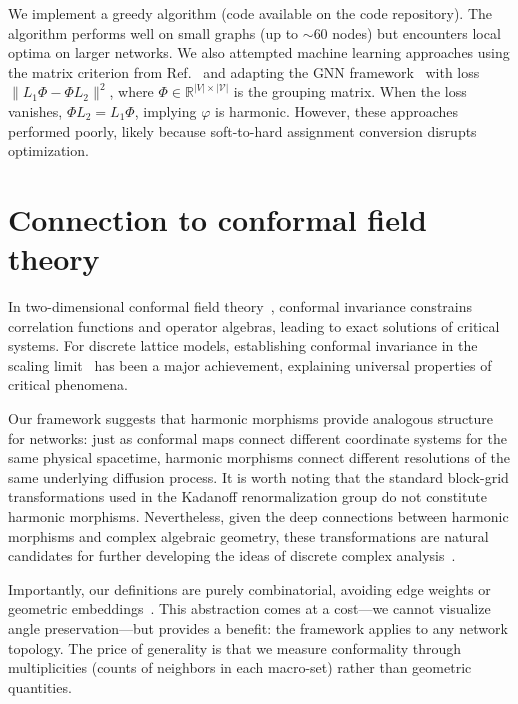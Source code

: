 \documentclass[twocolumn,superscriptaddress,tightenlines,aps,prx,floatfix]{revtex4-2}
\begin{document}
\begin{bibunit}
We implement a greedy algorithm (code available on the code repository). The algorithm performs well on small graphs (up to $\sim 60$ nodes) but encounters local optima on larger networks. We also attempted machine learning approaches using the matrix criterion from Ref.~\cite{Melles2024} and adapting the GNN framework~\cite{Coarse_graining_network_De_Domenico} with loss $\|L_1\Phi - \Phi L_2\|^2$, where $\Phi \in \mathbb{R}^{|V| \times |\mathcal{V}|}$ is the grouping matrix. When the loss vanishes, $\Phi L_2 = L_1 \Phi$, implying $\varphi$ is harmonic. However, these approaches performed poorly, likely because soft-to-hard assignment conversion disrupts optimization.


\section{Connection to conformal field theory}
\label{si:link-to-conformal-field-theory}

In two-dimensional conformal field theory~\cite{Introduction_to_Conformal_Field_Theory}, conformal invariance constrains correlation functions and operator algebras, leading to exact solutions of critical systems. For discrete lattice models, establishing conformal invariance in the scaling limit~\cite{Conformal_Invariance_Lattice_Models_Smirnov,Discrete_Complex_Analysis} has been a major achievement, explaining universal properties of critical phenomena. 

Our framework suggests that harmonic morphisms provide analogous structure for networks: just as conformal maps connect different coordinate systems for the same physical spacetime, harmonic morphisms connect different resolutions of the same underlying diffusion process. It is worth noting that the standard block-grid transformations used in the Kadanoff renormalization group do not constitute harmonic morphisms. Nevertheless, given the deep connections between harmonic morphisms and complex algebraic geometry, these transformations are natural candidates for further developing the ideas of discrete complex analysis~\cite{Discrete_Complex_Analysis}.

Importantly, our definitions are purely combinatorial, avoiding edge weights or geometric embeddings~\cite{conformallycovariantoperators,Bobenko_Conformal_2015,Conformal_Squid}. This abstraction comes at a cost---we cannot visualize angle preservation---but provides a benefit: the framework applies to any network topology. The price of generality is that we measure conformality through multiplicities (counts of neighbors in each macro-set) rather than geometric quantities.


\end{bibunit}
\end{document}
